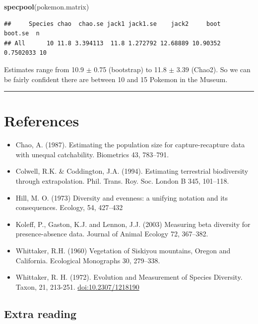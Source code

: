 \documentclass[]{book}
\newenvironment{Shaded}{\begin{snugshade}}{\end{snugshade}}
\newcommand{\KeywordTok}[1]{\textcolor[rgb]{0.13,0.29,0.53}{\textbf{{#1}}}}
\newcommand{\NormalTok}[1]{{#1}}
\providecommand{\tightlist}{%
  \setlength{\itemsep}{0pt}\setlength{\parskip}{0pt}}
\begin{document}
\begin{Shaded}
\begin{Highlighting}[]
\KeywordTok{specpool}\NormalTok{(pokemon.matrix)}
\end{Highlighting}
\end{Shaded}

\begin{verbatim}
##     Species chao  chao.se jack1 jack1.se    jack2     boot   boot.se  n
## All      10 11.8 3.394113  11.8 1.272792 12.68889 10.90352 0.7502033 10
\end{verbatim}

Estimates range from 10.9 \(\pm\) 0.75 (bootstrap) to 11.8 \(\pm\) 3.39
(Chao2). So we can be fairly confident there are between 10 and 15
Pokemon in the Museum.

\begin{center}\rule{0.5\linewidth}{\linethickness}\end{center}

\section{References}\label{references}

\begin{itemize}
\tightlist
\item
  Chao, A. (1987). Estimating the population size for capture-recapture
  data with unequal catchability. Biometrics 43, 783--791.
\item
  Colwell, R.K. \& Coddington, J.A. (1994). Estimating terrestrial
  biodiversity through extrapolation. Phil. Trans. Roy. Soc. London B
  345, 101--118.
\item
  Hill, M. O. (1973) Diversity and evenness: a unifying notation and its
  consequences. Ecology, 54, 427--432
\item
  Koleff, P., Gaston, K.J. and Lennon, J.J. (2003) Measuring beta
  diversity for presence-absence data. Journal of Animal Ecology 72,
  367--382.
\item
  Whittaker, R.H. (1960) Vegetation of Siskiyou mountains, Oregon and
  California. Ecological Monographs 30, 279--338.
\item
  Whittaker, R. H. (1972). Evolution and Measurement of Species
  Diversity. Taxon, 21, 213-251. \url{doi:10.2307/1218190}
\end{itemize}

\subsection{Extra reading}\label{extra-reading}
\end{document}
